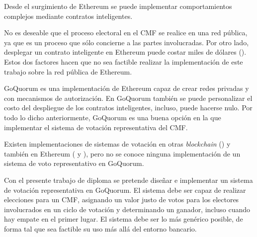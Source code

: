 Desde el surgimiento de Ethereum se puede implementar comportamientos complejos mediante contratos inteligentes.    

No es deseable que el proceso electoral en el CMF se realice en una red p\'ublica, ya que es un proceso que s\'olo concierne a las partes involucradas. Por otro lado, desplegar un contrato inteligente en Ethereum puede costar miles de d\'olares (\cite{eth-deploy}). Estos dos factores hacen que no sea factible realizar la implementaci\'on de este trabajo sobre la red p\'ublica de Ethereum. 

GoQuorum es una implementaci\'on de Ethereum capaz de crear redes privadas y con mecanismos de autorizaci\'on. En GoQuorum tambi\'en se puede personalizar el costo del despliegue de los contratos inteligentes, incluso, puede hacerse nulo. Por todo lo dicho anteriormente, GoQuorum es una buena opci\'on en la que implementar el sistema de votaci\'on representativa del CMF.


Existen implementaciones de sistemas de votaci\'on en otras \textit{blockchain} (\cite{agora}) y tambi\'en en Ethereum (\cite{ovn} y \cite{borda_count}), pero no se conoce ninguna implementaci\'on de un sistema de voto representativo en GoQuorum.



Con el presente trabajo de diploma  se pretende dise\~nar e implementar un sistema de votaci\'on representativa en GoQuorum. El sistema debe ser capaz de realizar elecciones para un CMF, asignando un valor justo de votos para los electores involucrados en un ciclo de votaci\'on y determinando un ganador, incluso cuando hay empate en el primer lugar. El sistema debe ser lo m\'as gen\'erico posible, de forma tal que sea factible su uso m\'as all\'a del entorno bancario.







